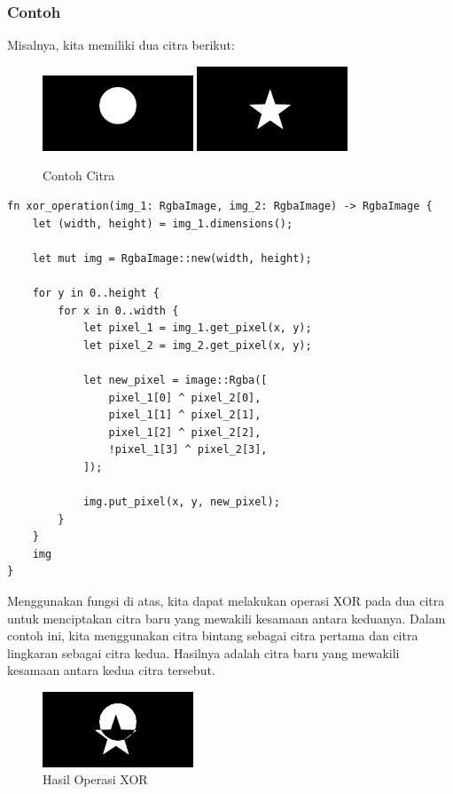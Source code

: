 \documentclass[a4paper,12pt,openany]{book}
\begin{document}
\subsubsection{Contoh}
Misalnya, kita memiliki dua citra berikut:
\begin{figure}[H]
    \centering
    \includegraphics[width=0.4\textwidth]{./image/boolean/circle.png}
    \includegraphics[width=0.4\textwidth]{./image/boolean/star-1.jpg}
    \caption{Contoh Citra}
\end{figure}

\begin{lstlisting}
fn xor_operation(img_1: RgbaImage, img_2: RgbaImage) -> RgbaImage {
    let (width, height) = img_1.dimensions();

    let mut img = RgbaImage::new(width, height);

    for y in 0..height {
        for x in 0..width {
            let pixel_1 = img_1.get_pixel(x, y);
            let pixel_2 = img_2.get_pixel(x, y);

            let new_pixel = image::Rgba([
                pixel_1[0] ^ pixel_2[0],
                pixel_1[1] ^ pixel_2[1],
                pixel_1[2] ^ pixel_2[2],
                !pixel_1[3] ^ pixel_2[3],
            ]);

            img.put_pixel(x, y, new_pixel);
        }
    }
    img
}
\end{lstlisting}

Menggunakan fungsi di atas, kita dapat melakukan operasi XOR pada dua citra untuk menciptakan citra baru yang mewakili kesamaan antara keduanya. Dalam contoh ini, kita menggunakan citra bintang sebagai citra pertama dan citra lingkaran sebagai citra kedua. Hasilnya adalah citra baru yang mewakili kesamaan antara kedua citra tersebut.

\begin{figure}[H]
    \centering
    \includegraphics[width=0.4\textwidth]{./image/boolean/output-xor-operation.png}
    \caption{Hasil Operasi XOR}
\end{figure}
\end{document}
